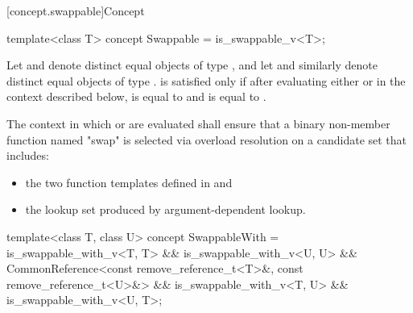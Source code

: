 [concept.swappable]{Concept }

%
\begin{itemdecl}
template<class T>
  concept Swappable = is_swappable_v<T>;
\end{itemdecl}

\begin{itemdescr}
\pnum
Let  and  denote distinct equal objects of type ,
and let  and  similarly denote distinct equal objects of
type .  is satisfied only if after
evaluating either  or  in the context
described below,  is equal to  and  is equal to
.

\pnum
The context in which  or  are evaluated
shall ensure that a binary non-member function named "swap" is selected via
overload resolution on a candidate set that includes:
\begin{itemize}
\item the two  function templates defined in
   and
\item the lookup set produced by argument-dependent
  lookup.
\end{itemize}
\end{itemdescr}

%
\begin{itemdecl}
template<class T, class U>
  concept SwappableWith =
    is_swappable_with_v<T, T> && is_swappable_with_v<U, U> &&
    CommonReference<const remove_reference_t<T>&, const remove_reference_t<U>&> &&
    is_swappable_with_v<T, U> && is_swappable_with_v<U, T>;
\end{itemdecl}

